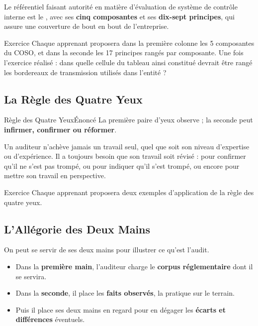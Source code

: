 Le référentiel faisant autorité en matière d'évaluation de système de contrôle interne
est le , avec ses \textbf{cinq composantes} et ses
\textbf{dix-sept principes}, qui assure une couverture de bout en bout de l'entreprise.

\begin{boxexo}{Exercice}
Chaque apprenant proposera dans la première colonne les 5 composantes du COSO,
et dans la seconde les 17 principes rangés par composante. Une fois l'exercice
réalisé : dans quelle cellule du tableau ainsi constitué devrait être rangé les
bordereaux de transmission utilisés dans l'entité ?
\end{boxexo}

\subsection{La Règle des Quatre Yeux}

\begin{boiteTheoreme}{Règle des Quatre Yeux}{Énoncé}
La première paire d'yeux observe ; la seconde peut \textbf{infirmer, confirmer ou
réformer}.
\end{boiteTheoreme}

Un auditeur n'achève jamais un travail seul, quel que soit son niveau d'expertise ou
d'expérience. Il a toujours besoin que son travail soit révisé : pour confirmer qu'il ne
s'est pas trompé, ou pour indiquer qu'il s'est trompé, ou encore pour mettre son
travail en perspective.

\begin{boxexo}{Exercice}
Chaque apprenant proposera deux exemples d'application de la règle des quatre yeux.
\end{boxexo}

\subsection{L'Allégorie des Deux Mains}

On peut se servir de ses deux mains pour illustrer ce qu'est l'audit.

\begin{itemize}
  \item Dans la \textbf{première main}, l'auditeur charge le
    \textbf{corpus réglementaire} dont il se servira.
  \item Dans la \textbf{seconde}, il place les \textbf{faits observés}, la pratique
    sur le terrain.
  \item Puis il place ses deux mains en regard pour en dégager les
    \textbf{écarts et différences} éventuels.
\end{itemize}

